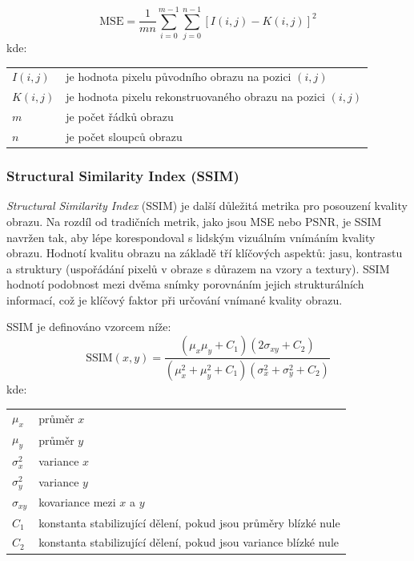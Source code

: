 \documentclass[male,czech,api_ing]{thesis}
\makeatletter
\newenvironment{conditions}[1][kde:]
    {#1 \begin{tabular}[t]{>{$}l<{$} @{${}={}$} >{\raggedright\arraybackslash}p{10cm}}}
    {\end{tabular}}
\makeatother
\begin{document}
\begin{equation}
    \text{MSE} = \frac{1}{mn} \sum_{i=0}^{m-1} \sum_{j=0}^{n-1} [I(i,j) - K(i,j)]^2
\end{equation}
\begin{conditions}
    I(i,j) &  je hodnota pixelu původního obrazu na pozici $(i, j)$ \\
    K(i,j) &  je hodnota pixelu rekonstruovaného obrazu na pozici $(i, j)$ \\
    m &  je počet řádků obrazu \\
    n &  je počet sloupců obrazu
\end{conditions}

\subsubsection{Structural Similarity Index (SSIM)}
\textit{Structural Similarity Index} (SSIM) je další důležitá metrika pro posouzení kvality obrazu. Na rozdíl od tradičních metrik, jako jsou MSE nebo PSNR, je SSIM navržen tak, aby lépe korespondoval s lidským vizuálním vnímáním kvality obrazu. Hodnotí kvalitu obrazu na základě tří klíčových aspektů: jasu, kontrastu a struktury (uspořádání pixelů v obraze s důrazem na vzory a textury). SSIM hodnotí podobnost mezi dvěma snímky porovnáním jejich strukturálních informací, což je klíčový faktor při určování vnímané kvality obrazu. \cite{PSNRSSIM}

SSIM je definováno vzorcem níže:
\begin{equation}
    \text{SSIM}(x, y) = \frac{(\mu_x \mu_y + C_1)(2\sigma_{xy} + C_2)}{(\mu_x^2 + \mu_y^2 + C_1)(\sigma_x^2 + \sigma_y^2 + C_2)}
\end{equation}
\begin{conditions}
    \mu_x & průměr $x$ \\
    \mu_y & průměr $y$ \\
    \sigma_x^2 & variance $x$ \\
    \sigma_y^2 & variance $y$ \\
    \sigma_{xy} & kovariance mezi $x$ a $y$ \\
    C_1 & konstanta stabilizující dělení, pokud jsou průměry blízké nule \\
    C_2 & konstanta stabilizující dělení, pokud jsou variance blízké nule
\end{conditions}
\end{document}
